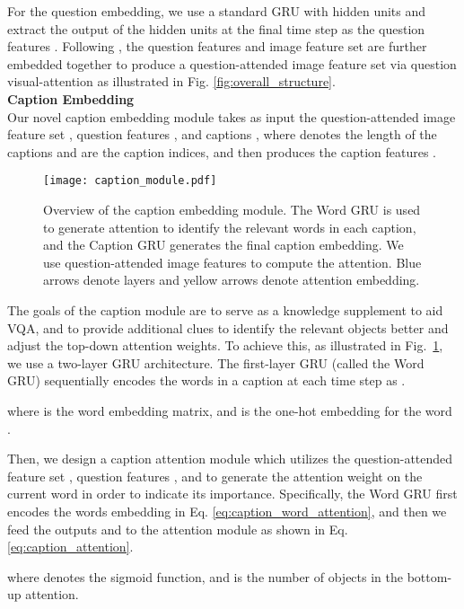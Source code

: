 \documentclass[11pt,a4paper]{article}
\begin{document}
For the question embedding, we use a standard GRU \cite{cho2014learning} with  hidden units and extract the output of the hidden units at the final time step as the question features .
Following , the question features  and image feature set  are further embedded together to produce a question-attended image feature set  via  question visual-attention  as illustrated in Fig. \ref{fig:overall_structure}.\\ 

\noindent\textbf{Caption Embedding}\\
Our novel caption embedding module takes as input the question-attended image feature set , question features , and   captions , where  denotes the length of the captions and  are the caption indices, and then produces the caption features . 

\begin{figure}[h]
\centering
\texttt{[image: caption\_module.pdf]}
\caption{Overview of the caption embedding module. The Word GRU is used to generate attention to identify the relevant words in each caption, and the Caption GRU generates the final caption embedding. We use question-attended image features  to compute the attention. Blue arrows denote  layers and yellow arrows denote attention embedding.}
\label{fig:caption_module}
\end{figure}

The goals of the caption module are to serve as a knowledge supplement to aid VQA, and to provide additional clues to identify the relevant objects better and adjust the top-down attention weights.
To achieve this, as illustrated in Fig.\ \ref{fig:caption_module}, we use a two-layer GRU architecture. The first-layer GRU (called the Word GRU)  sequentially encodes the words in a caption  at each time step as . 
   
where  is the word embedding matrix, and  is the one-hot embedding for the word .

Then, we design a caption attention module  which utilizes the question-attended feature set , question features , and  to generate the attention weight on the current word in order to indicate its importance. Specifically, the Word GRU first encodes the words embedding  in Eq. \ref{eq:caption_word_attention}, and then we feed the outputs  and  to the attention module  as shown in Eq. \ref{eq:caption_attention}. 

where  denotes the sigmoid function, and  is the number of objects in the bottom-up attention.
\end{document}
